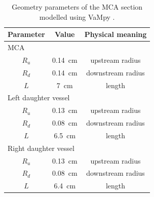 \documentclass[a4paper,titlepage]{scrartcl}
\begin{document}
\begin{table}
\center
\caption{Geometry parameters of the MCA section modelled using VaMpy \cite{Diem2016a}.\label{tab:geometry}}
\begin{tabular}{ccc}
\toprule
Parameter & Value & Physical meaning\\
\midrule
\multicolumn{3}{l}{MCA}\\
\midrule
$R_u$ & \SI{0.14}{\centi\metre} & upstream radius\\
$R_d$ & \SI{0.14}{\centi\metre} & downstream radius\\
$L$ & \SI{7}{\centi\metre} & length\\
\midrule
\multicolumn{3}{l}{Left daughter vessel}\\
\midrule
$R_u$ & \SI{0.13}{\centi\metre} & upstream radius\\
$R_d$ & \SI{0.08}{\centi\metre} & downstream radius\\
$L$ & \SI{6.5}{\centi\metre} & length\\
\midrule
\multicolumn{3}{l}{Right daughter vessel}\\
\midrule
$R_u$ & \SI{0.13}{\centi\metre} & upstream radius\\
$R_d$ & \SI{0.08}{\centi\metre} & downstream radius\\
$L$ & \SI{6.4}{\centi\metre} & length\\
\bottomrule
\end{tabular}
\end{table}
\end{document}
